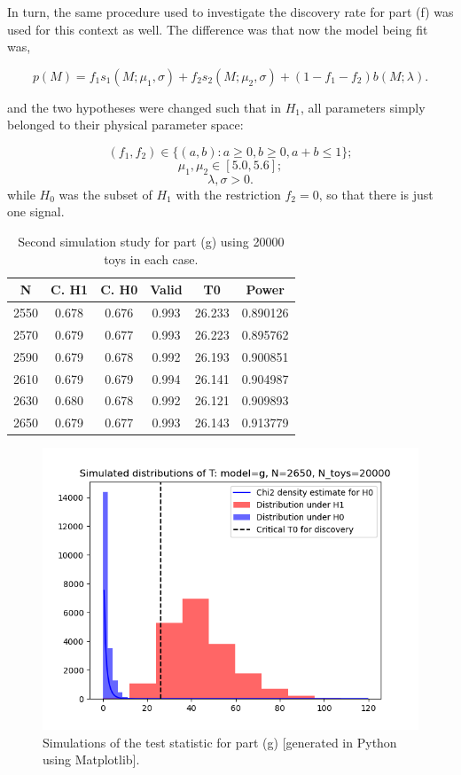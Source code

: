 \documentclass[12pt]{article}
\begin{document}
In turn, the same procedure used to investigate the discovery rate for part (f) was used for this context as well.
The difference was that now the model being fit was,

\[
    p(M) = f_1s_1(M;\mu_1,\sigma) + f_2s_2(M;\mu_2,\sigma) + (1-f_1-f_2)b(M;\lambda).
\]

and the two hypotheses were changed such that in $H_1$, all parameters simply belonged to their physical parameter space:

\[
    (f_1,f_2)\in\{(a,b):a\geq0,b\geq0,a+b\leq1\};
\]
\[
  \mu_1,\mu_2\in[5.0,5.6];
\]
\[
  \lambda, \sigma > 0.
\]
while $H_0$ was the subset of $H_1$ with the restriction $f_2=0$, so that there is just one signal.

\begin{table}[htp]
  \centering
  \begin{tabular}{| c | c | c | c | c | c |}
      \hline
         N & C. H1 & C. H0 & Valid & T0     & Power    \\
      \hline
      2550 & 0.678 & 0.676 & 0.993 & 26.233 & 0.890126 \\
      \hline
      2570 & 0.679 & 0.677 & 0.993 & 26.223 & 0.895762 \\
      \hline
      2590 & 0.679 & 0.678 & 0.992 & 26.193 & 0.900851 \\
      \hline
      2610 & 0.679 & 0.679 & 0.994 & 26.141 & 0.904987 \\
      \hline
      2630 & 0.680 & 0.678 & 0.992 & 26.121 & 0.909893 \\
      \hline
      2650 & 0.679 & 0.677 & 0.993 & 26.143 & 0.913779 \\
      \hline
  \end{tabular}
\caption{Second simulation study for part (g) using 20000 toys in each case.}
\label{tab_g_2}
\end{table}

\begin{figure}[hbt]
  \includegraphics[scale=0.8]{T_distributions_g_2650_20000.png}
  \caption{Simulations of the test statistic for part (g) [generated in Python using Matplotlib].}
  \label{part_g_plot}
\end{figure}
\end{document}
